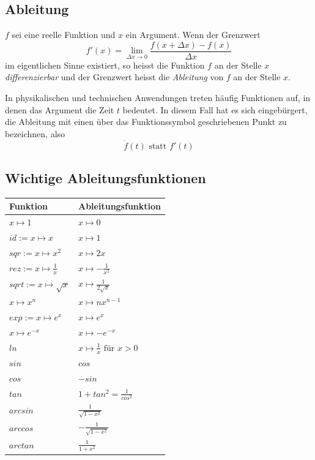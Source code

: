 \documentclass[10pt,a4paper]{article}
\begin{document}
\subsection{Ableitung}

$f$ sei eine reelle Funktion und $x$ ein Argument. Wenn der Grenzwert
$$f'(x) = \lim_{\Delta x \to 0}\frac{f(x + \Delta x) - f(x)}{\Delta x}$$
im eigentlichen Sinne existiert, so heisst die Funktion $f$ an der Stelle $x$ \textit{differenzierbar} und der Grenzwert heisst die \textit{Ableitung} von $f$ an der Stelle $x$.

In physikalischen und technischen Anwendungen treten häufig Funktionen auf, in denen das Argument die Zeit $t$ bedeutet. In diesem Fall hat es sich eingebürgert, die Ableitung mit einen über das Funktionssymbol geschriebenen Punkt zu bezeichnen, also
$$\dot{f}(t) \textrm{ statt } f'(t)$$


\subsection{Wichtige Ableitungsfunktionen}

\renewcommand{\arraystretch}{1.8}
\begin{longtable}{ll}
\hline
\textbf{Funktion} & \textbf{Ableitungsfunktion} \\\hline\endhead
$x \mapsto 1$ & $x \mapsto 0$ \\
$id := x \mapsto x$ & $x \mapsto 1$ \\
$sqr := x \mapsto x^2$ & $x \mapsto 2x$ \\
$rez := x \mapsto \frac{1}{x}$ & $x \mapsto -\frac{1}{x^2}$ \\
$sqrt := x \mapsto \sqrt{x}$ & $x \mapsto \frac{1}{2\sqrt{x}}$ \\
$x \mapsto x^n$ & $x \mapsto nx^{n-1}$ \\
$exp := x \mapsto e^x$ & $x \mapsto e^x$ \\
$x \mapsto e^{-x}$ & $x \mapsto -e^{-x}$ \\
$ln$ & $x \mapsto \frac{1}{x} \textrm{ für } x > 0$ \\
$sin$ & $cos$ \\
$cos$ & $-sin$ \\
$tan$ & $1 + tan^2 = \frac{1}{cos^2}$ \\
$arcsin$ & $\frac{1}{\sqrt{1 - x^2}}$ \\
$arccos$ & $-\frac{1}{\sqrt{1 - x^2}}$ \\
$arctan$ & $\frac{1}{1 + x^2}$ \\
\end{longtable}
\end{document}
